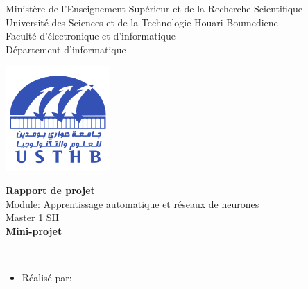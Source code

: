 \documentclass[12pt , a4paper]{report}
\begin{document}
\begin{center}
\normalsize{Ministère de l'Enseignement Supérieur et de la Recherche Scientifique}\\
\normalsize{Université des Sciences et de la Technologie Houari Boumediene}\\
\normalsize{Faculté d'électronique et d'informatique}\\
\normalsize{Département d'informatique}\\
\end{center}
\begin{center}
\includegraphics[width=4cm,height=4cm]{usthb.png}
\end{center}

\begin{center}
\Huge{\textbf{Rapport de projet}}\\
\vspace{0.7cm}
\large{Module: Apprentissage automatique et réseaux de neurones}\\
\vspace{0.2cm}
\large{Master 1 SII}\\
\vspace{1.5cm}
\normalsize{\textbf{Mini-projet}}
\end{center}
\vspace{3cm}
\\
\begin{itemize}
    \item{Réalisé par:}
\end{itemize}

\vspace{3cm}
\end{document}
